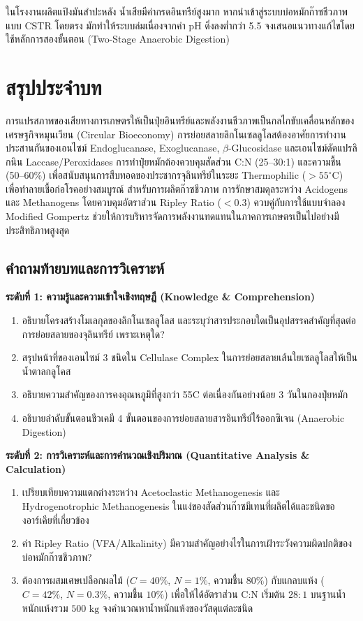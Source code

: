 \begin{insight}
ในโรงงานผลิตแป้งมันสำปะหลัง น้ำเสียมีค่ากรดอินทรีย์สูงมาก หากนำเข้าสู่ระบบบ่อหมักก๊าซชีวภาพแบบ CSTR โดยตรง มักทำให้ระบบล่มเนื่องจากค่า pH ดิ่งลงต่ำกว่า 5.5 จงเสนอแนวทางแก้ไขโดยใช้หลักการสองขั้นตอน (Two-Stage Anaerobic Digestion)
\end{insight}

\section*{สรุปประจำบท}

การแปรสภาพของเสียทางการเกษตรให้เป็นปุ๋ยอินทรีย์และพลังงานชีวภาพเป็นกลไกขับเคลื่อนหลักของเศรษฐกิจหมุนเวียน (Circular Bioeconomy) การย่อยสลายลิกโนเซลลูโลสต้องอาศัยการทำงานประสานกันของเอนไซม์ Endoglucanase, Exoglucanase, $\beta$-Glucosidase และเอนไซม์ดัดแปรลิกนิน Laccase/Peroxidases การทำปุ๋ยหมักต้องควบคุมสัดส่วน C:N (25--30:1) และความชื้น (50--60\%) เพื่อสนับสนุนการสืบทอดของประชากรจุลินทรีย์ในระยะ Thermophilic ($> 55^\circ\text{C}$) เพื่อทำลายเชื้อก่อโรคอย่างสมบูรณ์ สำหรับการผลิตก๊าซชีวภาพ การรักษาสมดุลระหว่าง Acidogens และ Methanogens โดยควบคุมอัตราส่วน Ripley Ratio ($< 0.3$) ควบคู่กับการใช้แบบจำลอง Modified Gompertz ช่วยให้การบริหารจัดการพลังงานทดแทนในภาคการเกษตรเป็นไปอย่างมีประสิทธิภาพสูงสุด

\subsection*{คำถามท้ายบทและการวิเคราะห์}

\noindent \textbf{ระดับที่ 1: ความรู้และความเข้าใจเชิงทฤษฎี (Knowledge \& Comprehension)}
\begin{enumerate}
    \item อธิบายโครงสร้างโมเลกุลของลิกโนเซลลูโลส และระบุว่าสารประกอบใดเป็นอุปสรรคสำคัญที่สุดต่อการย่อยสลายของจุลินทรีย์ เพราะเหตุใด?
    \item สรุปหน้าที่ของเอนไซม์ 3 ชนิดใน Cellulase Complex ในการย่อยสลายเส้นใยเซลลูโลสให้เป็นน้ำตาลกลูโคส
    \item อธิบายความสำคัญของการคงอุณหภูมิที่สูงกว่า 55\degree C ต่อเนื่องกันอย่างน้อย 3 วันในกองปุ๋ยหมัก
    \item อธิบายลำดับขั้นตอนชีวเคมี 4 ขั้นตอนของการย่อยสลายสารอินทรีย์ไร้ออกซิเจน (Anaerobic Digestion)
\end{enumerate}

\noindent \textbf{ระดับที่ 2: การวิเคราะห์และการคำนวณเชิงปริมาณ (Quantitative Analysis \& Calculation)}
\begin{enumerate}[resume]
    \item เปรียบเทียบความแตกต่างระหว่าง Acetoclastic Methanogenesis และ Hydrogenotrophic Methanogenesis ในแง่ของสัดส่วนก๊าซมีเทนที่ผลิตได้และชนิดของอาร์เคียที่เกี่ยวข้อง
    \item ค่า Ripley Ratio (VFA/Alkalinity) มีความสำคัญอย่างไรในการเฝ้าระวังความผิดปกติของบ่อหมักก๊าซชีวภาพ?
    \item ต้องการผสมเศษเปลือกผลไม้ ($C = 40\%$, $N = 1\%$, ความชื้น $80\%$) กับแกลบแห้ง ($C = 42\%$, $N = 0.3\%$, ความชื้น $10\%$) เพื่อให้ได้อัตราส่วน C:N เริ่มต้น $28:1$ บนฐานน้ำหนักแห้งรวม $500\text{ kg}$ จงคำนวณหาน้ำหนักแห้งของวัสดุแต่ละชนิด
\end{enumerate}

